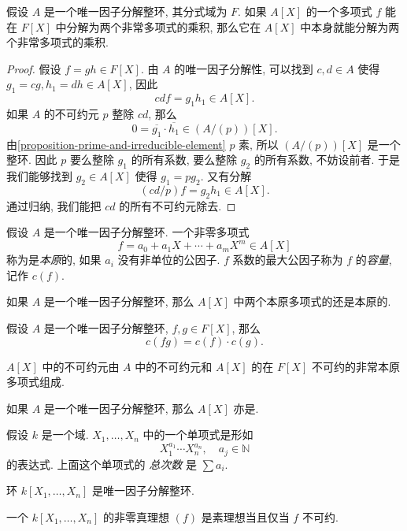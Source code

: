 \begin{proposition}
  假设 \( A \) 是一个唯一因子分解整环, 其分式域为 \( F \). 如果 \( A[X] \)
  的一个多项式 \( f \) 能在 \( F[X] \) 中分解为两个非常多项式的乘积,
  那么它在 \( A[X] \) 中本身就能分解为两个非常多项式的乘积.
\end{proposition}
\begin{proof}
  假设 \( f = gh \in F[X] \).
  由 \( A \) 的唯一因子分解性, 可以找到 \( c, d \in A  \) 使得 \( g_1 = cg, h_1
  = dh \in A[X] \), 因此
  \[
    cd f = g_1 h_1 \in A[X].
  \]
  如果 \( A \) 的不可约元 \( p \) 整除 \( cd \), 那么
  \[
    0 = \overline{g_1} \cdot \overline{h_1} \in (A / (p))[X].
  \]
  由\cref{proposition-prime-and-irreducible-element} \( p \) 素, 所以 \( (A /
  (p))[X] \) 是一个整环. 因此 \( p \) 要么整除 \( g_1 \) 的所有系数, 要么整除 \(
  g_2 \) 的所有系数, 不妨设前者. 于是我们能够找到 \( g_2 \in A[X] \) 使得 \( g_1
  = pg_2 \). 又有分解
  \[
    (cd / p)f = g_2 h_1 \in A[X].
  \]
  通过归纳, 我们能把 \( cd \) 的所有不可约元除去.
\end{proof}

假设 \( A \) 是一个唯一因子分解整环. 一个非零多项式
\[
  f = a_0 + a_1 X + \cdots + a_m X^m \in A[X]
\]
称为是\emph{本原}的, 如果 \( a_i \) 没有非单位的公因子.
\( f \) 系数的最大公因子称为 \( f \) 的\emph{容量}, 记作 \( c(f) \).

\begin{proposition}
  如果 \( A \) 是一个唯一因子分解整环, 那么 \( A[X] \)
  中两个本原多项式的还是本原的.
\end{proposition}

\begin{proposition}
  假设 \( A \) 是一个唯一因子分解整环, \( f, g \in F[X] \), 那么
  \[
    c(fg) = c(f) \cdot c(g).
  \]
\end{proposition}

\begin{corollary}
  \( A[X] \) 中的不可约元由  \( A \) 中的不可约元和 \( A[X] \)
  的在 \( F[X] \) 不可约的非常本原多项式组成.
\end{corollary}

\begin{theorem}
  如果 \( A \) 是一个唯一因子分解整环, 那么 \( A[X] \) 亦是.
\end{theorem}

假设 \( k \) 是一个域. \( X_1, \ldots, X_n \) 中的一个单项式是形如
\[
  X_1^{a_1} \cdots X_n^{a_n},\quad a_j \in \mathbb{N}
\]
的表达式. 上面这个单项式的 \emph{总次数} 是 \( \sum a_i \).

\begin{theorem}
  环 \( k[X_1, \ldots, X_n] \) 是唯一因子分解整环.
\end{theorem}

\begin{corollary}
  一个 \( k[X_1, \ldots, X_n] \) 的非零真理想 \( (f) \) 是素理想当且仅当 \( f \)
  不可约.
\end{corollary}

